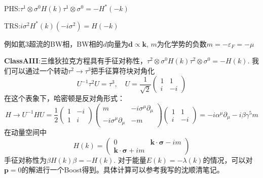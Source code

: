 \documentclass[a4paper]{article}
\numberwithin{equation}{subsection}
\begin{document}
PHS:$\tau^1\otimes\sigma^0H(k)\tau^1\otimes\sigma^0=-H^*(-k)$

TRS:$i\sigma^2H^*(k)(-i\sigma^2)=H(-k)$

例如氦3超流的BW相，BW相的$d$向量为$\bm{d}\propto\bm{k}$, $m$为化学势的负数$m=-\varepsilon_F=-\mu$

\textbf{ClassAIII}:三维狄拉克方程具有手征对称性，$\tau^2\otimes\sigma^0H(k)\tau^2\otimes\sigma^0=-H(k)$. 我们可以通过一个转动$\tau^2\rightarrow\tau^3$把手征算符块对角化
\begin{equation*}
    U^{-1}\tau^2U=\tau^3,\quad U=\frac{1}{\sqrt{2}}\begin{pmatrix}
        1&1\\
        i&-i
    \end{pmatrix}
\end{equation*}
在这个表象下，哈密顿是反对角形式：
\begin{equation*}
    H\rightarrow U^{-1}HU=\frac{1}{2}\begin{pmatrix}
        1&-i\\
        1&i
    \end{pmatrix}\begin{pmatrix}
        m&-i\sigma^\mu\partial_\mu\\
        -i\sigma^\mu\partial_\mu&-m
    \end{pmatrix}\begin{pmatrix}
        1&1\\
        i&-i
    \end{pmatrix}=-i\alpha^\mu\partial_\mu-i\beta\gamma^5m
\end{equation*}
在动量空间中
\begin{equation}
    H(k)=\begin{pmatrix}
        0&\bm{k}\cdot\bm{\sigma}-im\\
        \bm{k}\cdot\bm{\sigma}+im
    \end{pmatrix}
\end{equation}
手征对称性为$\beta H(k)\beta=-H(k)$. 对于能量$E(k)=-\lambda(k)$的情况，可以对$\bm{p}=0$的解进行一个Boost得到。具体计算可以参考我写的沈顺清笔记。
\end{document}
